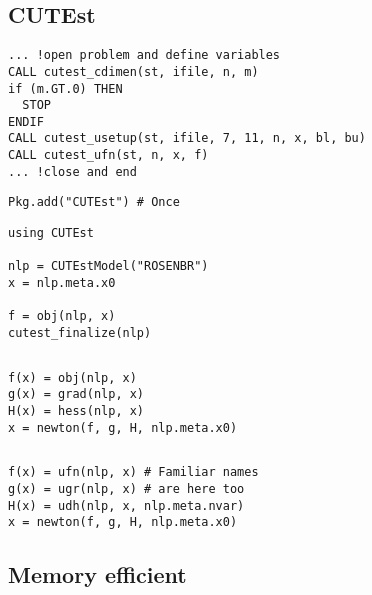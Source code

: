 \subsection{CUTEst}

\begin{frame}[t,fragile]
  \begin{verbatim}
... !open problem and define variables
CALL cutest_cdimen(st, ifile, n, m)
if (m.GT.0) THEN
  STOP
ENDIF
CALL cutest_usetup(st, ifile, 7, 11, n, x, bl, bu)
CALL cutest_ufn(st, n, x, f)
... !close and end
\end{verbatim}
\end{frame}

\begin{frame}[t,fragile]
  \begin{verbatim}
Pkg.add("CUTEst") # Once
\end{verbatim}
\begin{verbatim}
using CUTEst

nlp = CUTEstModel("ROSENBR")
x = nlp.meta.x0

f = obj(nlp, x)
cutest_finalize(nlp)
\end{verbatim}
\end{frame}

\begin{frame}[t,fragile]
  \inputminted{julia}{src/newton.jl}
\begin{verbatim}
f(x) = obj(nlp, x)
g(x) = grad(nlp, x)
H(x) = hess(nlp, x)
x = newton(f, g, H, nlp.meta.x0)
\end{verbatim}
\end{frame}

\begin{frame}[t,fragile]
  \inputminted{julia}{src/newton.jl}
\begin{verbatim}
f(x) = ufn(nlp, x) # Familiar names
g(x) = ugr(nlp, x) # are here too
H(x) = udh(nlp, x, nlp.meta.nvar)
x = newton(f, g, H, nlp.meta.x0)
\end{verbatim}
\end{frame}

\subsection{Memory efficient}

\begin{frame}[t,fragile]
  \inputminted{julia}{src/newtoninplace.jl}
\end{frame}

